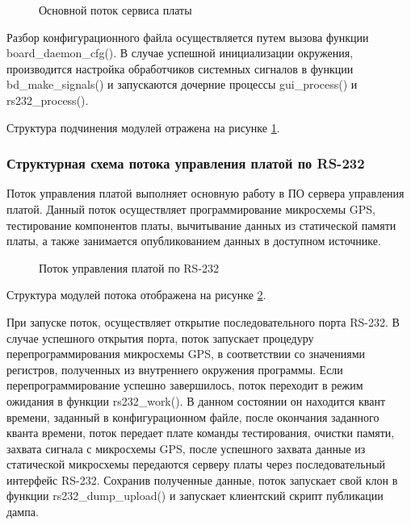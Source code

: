\begin{figure}[h]
\begin{center}
\end{center}
\caption{Основной поток сервиса платы}
\label{pic:board_daemon}
\end{figure}

Разбор конфигурационного файла осуществляется путем вызова функции board\_daemon\_cfg(). В случае успешной инициализации окружения,
производится настройка обработчиков системных сигналов в функции bd\_make\_signals() и запускаются дочерние процессы gui\_process()
и rs232\_process().

Структура подчинения модулей отражена на рисунке \ref{pic:board_daemon}.


\subsubsection*{Структурная схема потока управления платой по RS-232}
Поток управления платой выполняет основную работу в ПО сервера управления платой. Данный поток осуществляет программирование
микросхемы GPS, тестирование компонентов платы, вычитывание данных из статической памяти платы, а также занимается опубликованием
данных в доступном источнике.

\begin{figure}[h]
\begin{center}
\end{center}
\caption{Поток управления платой по RS-232}
\label{pic:rs232_dumper}
\end{figure}

Структура модулей потока отображена на рисунке \ref{pic:rs232_dumper}.

При запуске поток, осуществляет открытие последовательного порта RS-232. В случае успешного открытия порта, поток запускает
процедуру перепрограммирования микросхемы GPS, в соответствии со значениями регистров, полученных из
внутреннего окружения программы. Если перепрограммирование успешно завершилось, поток переходит в режим ожидания в функции
rs232\_work(). В данном состоянии он находится квант времени, заданный в конфигурационном файле, после окончания заданного
кванта времени, поток передает плате команды тестирования, очистки памяти, захвата сигнала с микросхемы GPS, после успешного
захвата данные из статической микросхемы передаются серверу платы через последовательный интерфейс RS-232. Сохранив полученные
данные, поток запускает свой клон в функции rs232\_dump\_upload() и запускает клиентский скрипт публикации дампа.

